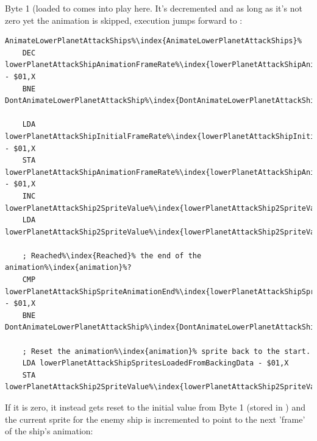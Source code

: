 Byte 1 (loaded to  comes into play here. It's decremented and as long as it's
not zero yet the animation is skipped, execution jumps forward to :

\begin{lstlisting}[escapechar=\%]
AnimateLowerPlanetAttackShips%\index{AnimateLowerPlanetAttackShips}%   
    DEC lowerPlanetAttackShipAnimationFrameRate%\index{lowerPlanetAttackShipAnimationFrameRate}% - $01,X
    BNE DontAnimateLowerPlanetAttackShip%\index{DontAnimateLowerPlanetAttackShip}%

    LDA lowerPlanetAttackShipInitialFrameRate%\index{lowerPlanetAttackShipInitialFrameRate}% - $01,X
    STA lowerPlanetAttackShipAnimationFrameRate%\index{lowerPlanetAttackShipAnimationFrameRate}% - $01,X
    INC lowerPlanetAttackShip2SpriteValue%\index{lowerPlanetAttackShip2SpriteValue}%,X
    LDA lowerPlanetAttackShip2SpriteValue%\index{lowerPlanetAttackShip2SpriteValue}%,X

    ; Reached%\index{Reached}% the end of the animation%\index{animation}%?
    CMP lowerPlanetAttackShipSpriteAnimationEnd%\index{lowerPlanetAttackShipSpriteAnimationEnd}% - $01,X
    BNE DontAnimateLowerPlanetAttackShip%\index{DontAnimateLowerPlanetAttackShip}%

    ; Reset the animation%\index{animation}% sprite back to the start.
    LDA lowerPlanetAttackShipSpritesLoadedFromBackingData - $01,X
    STA lowerPlanetAttackShip2SpriteValue%\index{lowerPlanetAttackShip2SpriteValue}%,X
\end{lstlisting}

If it is zero, it instead gets reset to the initial value from Byte 1 (stored in
 )
and the current sprite for the enemy ship is incremented to point to the next 'frame' of the ship's animation:


